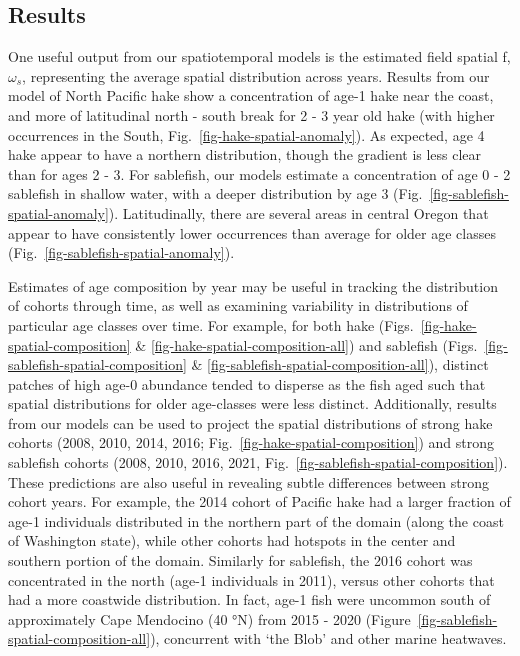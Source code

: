\documentclass[
]{article}
\begin{document}
\subsection{Results}\label{results}

One useful output from our spatiotemporal models is the estimated field
spatial f, \(\omega_s\), representing the average spatial distribution
across years. Results from our model of North Pacific hake show a
concentration of age-1 hake near the coast, and more of latitudinal
north - south break for 2 - 3 year old hake (with higher occurrences in
the South, Fig.~\ref{fig-hake-spatial-anomaly}). As expected, age 4 hake
appear to have a northern distribution, though the gradient is less
clear than for ages 2 - 3. For sablefish, our models estimate a
concentration of age 0 - 2 sablefish in shallow water, with a deeper
distribution by age 3 (Fig.~\ref{fig-sablefish-spatial-anomaly}).
Latitudinally, there are several areas in central Oregon that appear to
have consistently lower occurrences than average for older age classes
(Fig.~\ref{fig-sablefish-spatial-anomaly}).

Estimates of age composition by year may be useful in tracking the
distribution of cohorts through time, as well as examining variability
in distributions of particular age classes over time. For example, for
both hake (Figs.~\ref{fig-hake-spatial-composition} \&
\ref{fig-hake-spatial-composition-all}) and sablefish
(Figs.~\ref{fig-sablefish-spatial-composition} \&
\ref{fig-sablefish-spatial-composition-all}), distinct patches of high
age-0 abundance tended to disperse as the fish aged such that spatial
distributions for older age-classes were less distinct. Additionally,
results from our models can be used to project the spatial distributions
of strong hake cohorts (2008, 2010, 2014, 2016;
Fig.~\ref{fig-hake-spatial-composition}) and strong sablefish cohorts
(2008, 2010, 2016, 2021, Fig.~\ref{fig-sablefish-spatial-composition}).
These predictions are also useful in revealing subtle differences
between strong cohort years. For example, the 2014 cohort of Pacific
hake had a larger fraction of age-1 individuals distributed in the
northern part of the domain (along the coast of Washington state), while
other cohorts had hotspots in the center and southern portion of the
domain. Similarly for sablefish, the 2016 cohort was concentrated in the
north (age-1 individuals in 2011), versus other cohorts that had a more
coastwide distribution. In fact, age-1 fish were uncommon south of
approximately Cape Mendocino (40 °N) from 2015 - 2020
(Figure~\ref{fig-sablefish-spatial-composition-all}), concurrent with
`the Blob' and other marine heatwaves.
\end{document}
